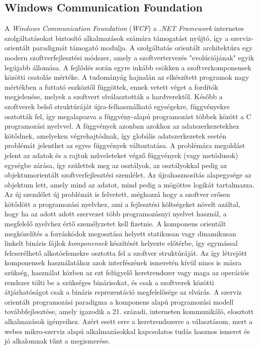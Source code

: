 \subsection{Windows Communication Foundation} \label{ssection:wcf_intro}
A \emph{Windows Communication Foundation} (\emph{WCF}) a \textit{.NET Framework} internetes szolgáltatásokat biztosító alkalmazások számára támogatást nyújtó, így a szerviz-orientált paradigmát támogató modulja. A szolgáltatás orientált architektúra egy modern szoftverfejlesztési módszer, amely a szoftvertervezés "evolúciójának" egyik legújabb állomása. A fejlődés során egyre inkább csökken a szoftverkomponensek közötti csatolás mértéke. A tudományág hajnalán az elkészített programok nagy mértékben a futtató eszköztől függöttek, ennek vetett véget a fordítók megjelenése, melyek a szoftvert elválasztották a hardverektől. Később a szoftverek belső struktúráját újra-felhasználható egységekre, függvényekre osztották fel, így megalapozva a függvény-alapú programozást többek között a C programozási nyelvvel. A függvények azonban azokhoz az adatszerkezetekhez kötődnek, amelyeken végrehajtódnak, így globális adatszerkezetek esetén problémát jelenthet az egyes függvények változtatása. A problémára megoldást jelent az adatok és a rajtuk műveleteket végző függvények (vagy metódusok) egységbe zárása, így születtek meg az osztályok, az osztályokkal pedig az objektumorientált szoftverfejlesztési szemlélet. Az újrahasznosítás alapegysége az objektum lett, amely mind az adatot, mind pedig a mögöttes logikát tartalmazza. Az új szemlélet új problémát is felvetett, méghozzá hogy a szoftver erősen kötődött a programozási nyelvhez, ami a fejlesztési költségeket növelt azáltal, hogy ha az adott adott szervezet több programozásnyi nyelvet használ, a megfelelő nyelvhez értő személyzetet kell fizetnie. A komponens orientált megközelítés a forráskódok megosztása helyett statikusan vagy dinamikusan linkelt bináris fájlok \emph{komponensek} készítését helyezte előtérbe, így egymással felcserélhető alkotóelemekre osztotta fel a szoftver struktúráját. Az így létrejött komponensek használatához azok interfészének ismeretén kívül nincs is másra szükség, használat közben az ezt felügyelő keretrendszer vagy maga az operációs rendszer tölti be a szükséges binárisokat, és csak a szoftverek közötti átjárhatóságot csak a bináris reprezentáció megfelelősége az elvárás. A szerviz orientált programozási paradigma a komponens alapú programozási modell továbbfejlesztése, amely igazodik a 21. századi, interneten kommunikáló, elosztott alkalmazások igényeihez. Azért esett erre a keretrendszerre a választásom, mert a webes mikro-szerviz alapú alkalmazásokkal kapcsolatos tudás hasznos ismeret és jó alkalomnak tűnt a megismerése.

